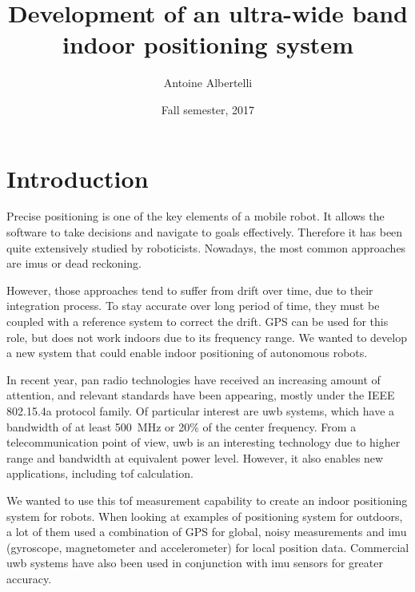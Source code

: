 \documentclass[a4paper, 12pt]{scrreprt}
\title{Development of an ultra-wide band indoor positioning system}
\author{Antoine Albertelli}
\date{Fall semester, 2017}
\begin{document}
\newcommand{\ieeepan}[0]{IEEE 802.15.4a}

\setcounter{tocdepth}{1}


\maketitle


\tableofcontents


\chapter{Introduction}

Precise positioning is one of the key elements of a mobile robot.
It allows the software to take decisions and navigate to goals effectively.
Therefore it has been quite extensively studied by roboticists.
Nowadays, the most common approaches are \glspl{imu} or dead reckoning.

However, those approaches tend to suffer from drift over time, due to their integration process.
To stay accurate over long period of time, they must be coupled with a reference system to correct the drift.
GPS can be used for this role, but does not work indoors due to its frequency range.
We wanted to develop a new system that could enable indoor positioning of autonomous robots.

In recent year, \gls{pan} radio technologies have received an increasing amount of attention\cite{di2006uwb}, and relevant standards have been appearing, mostly under the \ieeepan{} protocol family.
Of particular interest are \gls{uwb} systems, which have a bandwidth of at least \SI{500}{\mega\hertz} or 20\% of the center frequency\cite{uwb2006characteristics}.
From a telecommunication point of view, \gls{uwb} is an interesting technology due to higher range and bandwidth at equivalent power level.
However, it also enables new applications, including \gls{tof} calculation.

We wanted to use this \gls{tof} measurement capability to create an indoor positioning system for robots.
When looking at examples of positioning system for outdoors, a lot of them used a combination of GPS for global, noisy measurements and \gls{imu} (gyroscope, magnetometer and accelerometer) for local position data\cite{sporttracking,titterton2004strapdown}.
Commercial \gls{uwb} systems have also been used in conjunction with \gls{imu} sensors for greater accuracy\cite{corrales2008hybrid}.
\end{document}
